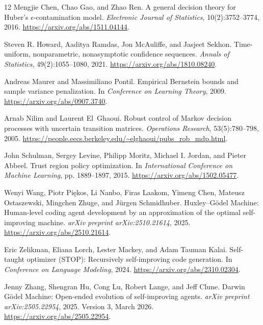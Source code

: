 \begin{thebibliography}{12}
Mengjie Chen, Chao Gao, and Zhao Ren.
A general decision theory for Huber's $\epsilon$-contamination model.
\emph{Electronic Journal of Statistics}, 10(2):3752--3774, 2016.
\url{https://arxiv.org/abs/1511.04144}.

Steven R. Howard, Aaditya Ramdas, Jon McAuliffe, and Jasjeet Sekhon.
Time-uniform, nonparametric, nonasymptotic confidence sequences.
\emph{Annals of Statistics}, 49(2):1055--1080, 2021.
\url{https://arxiv.org/abs/1810.08240}.

Andreas Maurer and Massimiliano Pontil.
Empirical Bernstein bounds and sample variance penalization.
In \emph{Conference on Learning Theory}, 2009.
\url{https://arxiv.org/abs/0907.3740}.

Arnab Nilim and Laurent El~Ghaoui.
Robust control of Markov decision processes with uncertain transition matrices.
\emph{Operations Research}, 53(5):780--798, 2005.
\url{https://people.eecs.berkeley.edu/~elghaoui/pubs_rob_mdp.html}.

John Schulman, Sergey Levine, Philipp Moritz, Michael I. Jordan, and Pieter Abbeel.
Trust region policy optimization.
In \emph{International Conference on Machine Learning}, pp. 1889--1897, 2015.
\url{https://arxiv.org/abs/1502.05477}.

Wenyi Wang, Piotr Pi\k{e}kos, Li Nanbo, Firas Laakom, Yimeng Chen, Mateusz Ostaszewski, Mingchen Zhuge, and J\"urgen Schmidhuber.
Huxley--G\"odel Machine: Human-level coding agent development by an approximation of the optimal self-improving machine.
\emph{arXiv preprint arXiv:2510.21614}, 2025.
\url{https://arxiv.org/abs/2510.21614}.

Eric Zelikman, Eliana Lorch, Lester Mackey, and Adam Tauman Kalai.
Self-taught optimizer (STOP): Recursively self-improving code generation.
In \emph{Conference on Language Modeling}, 2024.
\url{https://arxiv.org/abs/2310.02304}.

Jenny Zhang, Shengran Hu, Cong Lu, Robert Lange, and Jeff Clune.
Darwin G\"odel Machine: Open-ended evolution of self-improving agents.
\emph{arXiv preprint arXiv:2505.22954}, 2025. Version 3, March 2026.
\url{https://arxiv.org/abs/2505.22954}.


\end{thebibliography}
